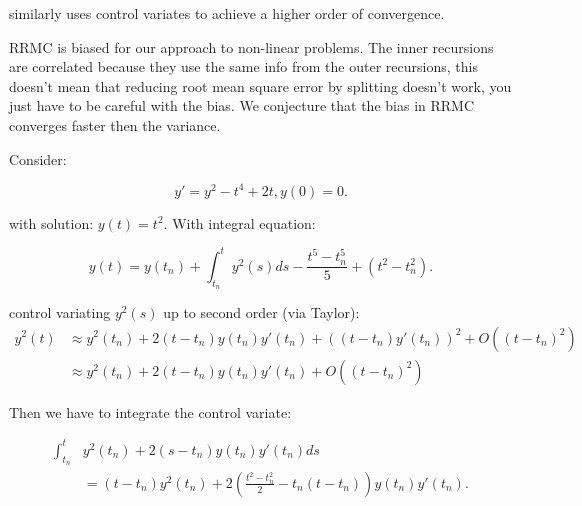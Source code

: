 \documentclass[a4paper,12pt]{article}
\begin{document}
\begin{related}[CV RRMC]
    \cite{daun_randomized_2011} similarly uses control variates to achieve
    a higher order of convergence.
\end{related}

RRMC is biased for our approach to non-linear problems.
The inner recursions are correlated because they use the same
info from the outer recursions, this doesn't mean that reducing
root mean square error by splitting doesn't work, you just have to be careful
with the bias. We conjecture that the bias in RRMC converges faster then the
variance.


\begin{example} \label{ex:nonlinear RRMC IVP}
    Consider:

    \begin{equation}
        y' = y^{2} - t^{4} +2t,y(0)=0.
    \end{equation}

    with solution: $y(t)=t^{2}$. With integral equation:

    \begin{equation}
        y(t)= y(t_{n}) + \int_{t_{n}}^{t} y^{2}(s) ds
        - \frac{t^{5}-t_{n}^{5}}{5} +(t^{2}-t_{n}^{2}) .
    \end{equation}

    control variating $y^{2}(s)$ up to second order (via Taylor):
    \begin{align}
        y^{2}(t) & \approx y^{2}(t_{n}) + 2(t-t_{n})y(t_{n})y'(t_{n})
        + ((t-t_{n})y'(t_{n}))^{2} + O((t-t_{n})^{2})                                   \\
                 & \approx y^{2}(t_{n}) + 2(t-t_{n})y(t_{n})y'(t_{n})+ O((t-t_{n})^{2})
    \end{align}

    Then we have to integrate the control variate:

    \begin{align}
        \int_{t_{n}}^{t} & y^{2}(t_{n}) + 2(s-t_{n})y(t_{n})y'(t_{n}) ds \\
                         & = (t-t_{n})y^{2}(t_{n})+
        2\left(\frac{t^{2}-t_{n}^{2}}{2} -t_{n}(t-t_{n}) \right)y(t_{n})y'(t_{n}).
    \end{align}

\end{example}

\begin{pythonn} \label{py:nonlinear RRMC IVP}
\end{pythonn}
\end{document}

